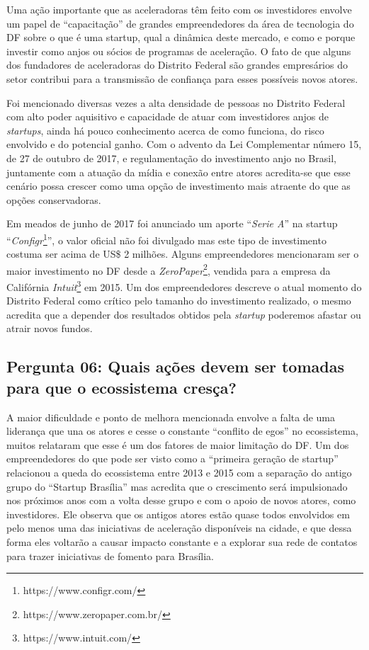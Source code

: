 Uma ação importante que as aceleradoras têm feito com os investidores envolve um papel de ``capacitação'' de grandes empreendedores da área de tecnologia do DF sobre o que é uma startup, qual a dinâmica deste mercado, e como e porque investir como anjos ou sócios de programas de aceleração. O fato de que alguns dos fundadores de aceleradoras do Distrito Federal são grandes empresários do setor contribui para a transmissão de confiança para esses possíveis novos atores. 

Foi mencionado diversas vezes a alta densidade de pessoas no Distrito Federal com alto poder aquisitivo e capacidade de atuar com investidores anjos de \textit{startups}, ainda há pouco conhecimento acerca de como funciona, do risco envolvido e do potencial ganho. Com o advento da Lei Complementar número 15, de 27 de outubro de 2017, e regulamentação do investimento anjo no Brasil, juntamente com a atuação da mídia e conexão entre atores acredita-se que esse cenário possa crescer como uma opção de investimento mais atraente do que as opções conservadoras.

Em meados de junho de 2017 foi anunciado um aporte ``\textit{Serie A}'' na startup ``\textit{Configr}\footnote{https://www.configr.com/}'', o valor oficial não foi divulgado mas este tipo de investimento costuma ser acima de US\$ 2 milhões. Alguns empreendedores mencionaram ser o maior investimento no DF desde a \textit{ZeroPaper}\footnote{https://www.zeropaper.com.br/}, vendida para a empresa da Califórnia \textit{Intuit}\footnote{https://www.intuit.com/} em 2015. Um dos empreendedores descreve o atual momento do Distrito Federal como crítico pelo tamanho do investimento realizado, o mesmo acredita que a depender dos resultados obtidos pela \textit{startup} poderemos afastar ou atrair novos fundos.

\subsection*{Pergunta 06: Quais ações devem ser tomadas para que o ecossistema cresça?}
\label{subsection:pergunta_de_pesquisa_6}

A maior dificuldade e ponto de melhora mencionada envolve a falta de uma liderança que una os atores e cesse o constante ``conflito de egos'' no ecossistema, muitos relataram que esse é um dos fatores de maior limitação do DF. Um dos empreendedores do que pode ser visto como a ``primeira geração de startup'' relacionou a queda do ecossistema entre 2013 e 2015 com a separação do antigo grupo do ``Startup Brasília'' mas acredita que o crescimento será impulsionado nos próximos anos com a volta desse grupo e com o apoio de novos atores, como investidores. Ele observa que os antigos atores estão quase todos envolvidos em pelo menos uma das iniciativas de aceleração disponíveis na cidade, e que dessa forma eles voltarão a causar impacto constante e a explorar sua rede de contatos para trazer iniciativas de fomento para Brasília.  

